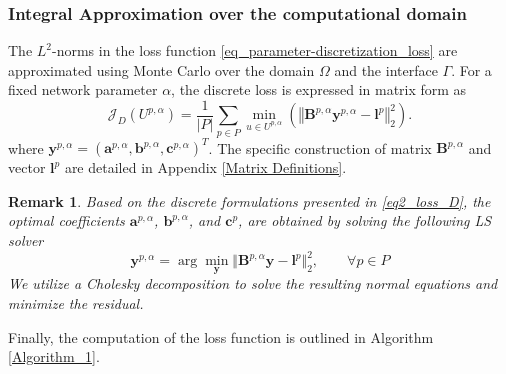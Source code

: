 \documentclass[oneside]{article}
\newtheorem{remark}[theorem]{Remark}
\begin{document}
\subsubsection*{Integral Approximation over the computational domain}
The $L^2$-norms in the loss function \eqref{eq_parameter-discretization_loss} are approximated using Monte Carlo over the domain $\Omega$ and the interface $\Gamma$. For a fixed network parameter $\alpha$, the discrete loss is expressed in matrix form as 
\begin{equation}\label{eq2_loss_D}
    {\mathcal{J}}_D(U^{p, \alpha}) =  \frac{1}{|P|} \sum_{p \in P}  \min_{u \in U^{p, \alpha}} \left( \left\Vert \mathbf{B}^{p, \alpha} \mathbf{y}^{p, \alpha} - \mathbf{l}^p\right\Vert_2^2 \right).
\end{equation}
where $\mathbf{y}^{p, \alpha} = (\mathbf{a}^{p, \alpha}, \mathbf{b}^{p, \alpha}, \mathbf{c}^{p, \alpha})^T$. The specific construction of matrix $\mathbf{B}^{p, \alpha}$ and vector $\mathbf{l}^p$ are detailed in Appendix \ref{Matrix Definitions}.
\begin{remark}
    Based on the discrete formulations presented in \eqref{eq2_loss_D}, the optimal coefficients $\mathbf{a}^{p, \alpha}$, $\mathbf{b}^{p, \alpha}$, and $\mathbf{c}^{p}$, are obtained by solving the following LS solver
\begin{equation}\label{eq2_optimal_coeff_discrete}
    \mathbf{y}^{p,\alpha} =  \arg\min_{\mathbf{y}} \Vert\mathbf{B}^{p,\alpha}\mathbf{y}-\mathbf{l}^p\Vert_2^2, \qquad \forall p \in P
\end{equation}
We utilize a Cholesky decomposition to solve the resulting normal equations and minimize the residual.
\end{remark}
\noindent Finally, the computation of the loss function is outlined in Algorithm \ref{Algorithm_1}. 

\end{document}
